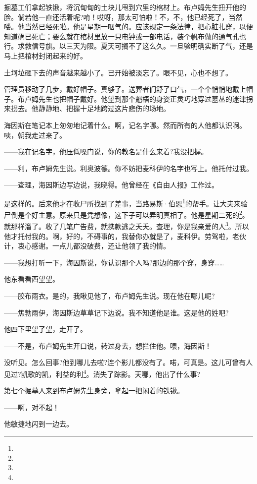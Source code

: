 \par 掘墓工们拿起铁锹，将沉甸甸的土块儿甩到穴里的棺材上。布卢姆先生扭开他的脸。倘若他一直还活着呢?唷！哎呀，那太可怕啦！不，不，他已经死了，当然喽。他当然已经死啦。他是星期一咽气的。应该规定一条法律，把心脏扎穿，以便知道确已死亡；要么就在棺材里放一只电钟或一部电话，装个帆布做的通气孔也行。求救信号旗。以三天为限。夏天可搁不了这么久。一旦验明确实断了气，还是马上把棺材封闭起来的好。
\par 土坷垃砸下去的声音越来越小了。已开始被淡忘了。眼不见，心也不想了。
\par 管理员移动了几步，戴好帽子。真够了。送葬者们舒了口气，一个个悄悄地戴上帽子。布卢姆先生也把帽子戴好。他望到那个魁梧的身姿正灵巧地穿过墓丛的迷津拐来拐去。他静静地、把握十足地跨过这片悲伤的场地。
\par 海因斯在笔记本上匆匆地记着什么。啊，记名字哪。然而所有的人他都认识啊。咦，朝我走过来了。
\par ——我在记名字，他压低嗓门说，你的教名是什么来着?我没把握。
\par ——利，布卢姆先生说。利奥波德。你不妨把麦科伊的名字也写上。他托付过我。
\par ——查理，海因斯边写边说，我晓得。他曾经在《自由人报》工作过。
\par 是这样的。后来他才在收尸所找到了差事，当路易斯·伯恩\footnote{}的帮手。让大夫来验尸倒是个好主意。原来只是凭想像，这下子可以弄明真相了。他是星期二死的\footnote{}。就那样溜了。收了几笔广告费，就携款逃之夭夭。查理，你是我亲爱的人\footnote{}。所以他才托付我的。啊，好的，不碍事的，我替你办就是了，麦科伊。劳驾啦，老伙计，衷心感谢。一点儿都没破费，还让他领了我的情。
\par ——我想打听一下，海因斯说，你认识那个人吗?那边的那个穿，身穿……
\par 他东看看西望望。
\par ——胶布雨衣。是的，我瞅见他了，布卢姆先生说。现在他在哪儿呢?
\par ——焦勃雨伊，海因斯边草草记下边说。我不知道他是谁。这是他的姓吧?
\par 他四下里望了望，走开了。
\par ——不是，布卢姆先生开口说，转过身去，想拦住他。喂，海因斯！
\par 没听见。怎么回事?他到哪儿去啦?连个影儿都没有了。喏，可真是。这儿可曾有人见过?凯歌的凯，利益的利\footnote{}。消失了踪影。天哪，他出了什么事?
\par 第七个掘墓人来到布卢姆先生身旁，拿起一把闲着的铁锹。
\par ——啊，对不起！
\par 他敏捷地闪到一边去。
